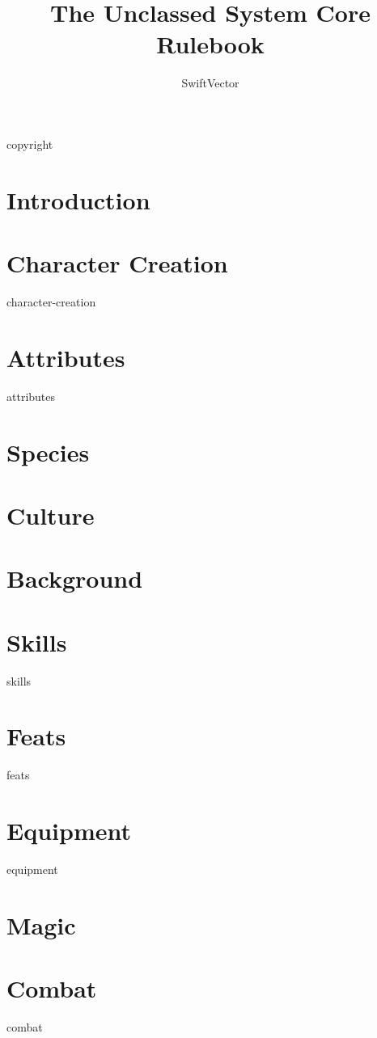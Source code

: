 \documentclass{book}
\title{The Unclassed System Core Rulebook}
\author{SwiftVector}
\begin{document}
\maketitle

\frontmatter

{copyright}

\tableofcontents

\mainmatter
\chapter{Introduction}


\chapter{Character Creation}
{character-creation}

\chapter{Attributes}\label{attributes}
{attributes}

\chapter{Species}\label{species}


\chapter{Culture}\label{culture}


\chapter{Background}\label{background}


\chapter{Skills}\label{skills}
{skills}

\chapter{Feats}\label{feats}
{feats}

\chapter{Equipment}\label{equipment}
{equipment}

\chapter{Magic}\label{magic}


\chapter{Combat}\label{combat}
{combat}

\backmatter

\printindex

\glsaddallunused
\printglossary[type=\acronymtype]
\printglossary
\end{document}
